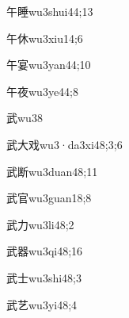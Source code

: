 \begin{verbete}{午睡}{wu3shui4}{4;13}
\end{verbete}

\begin{verbete}{午休}{wu3xiu1}{4;6}
\end{verbete}

\begin{verbete}{午宴}{wu3yan4}{4;10}
\end{verbete}

\begin{verbete}{午夜}{wu3ye4}{4;8}
\end{verbete}

\begin{verbete}{武}{wu3}{8}
\end{verbete}

\begin{verbete}{武大戏}{wu3·da3xi4}{8;3;6}
\end{verbete}

\begin{verbete}{武断}{wu3duan4}{8;11}
\end{verbete}

\begin{verbete}{武官}{wu3guan1}{8;8}
\end{verbete}

\begin{verbete}{武力}{wu3li4}{8;2}
\end{verbete}

\begin{verbete}{武器}{wu3qi4}{8;16}
\end{verbete}

\begin{verbete}{武士}{wu3shi4}{8;3}
\end{verbete}

\begin{verbete}{武艺}{wu3yi4}{8;4}
\end{verbete}


